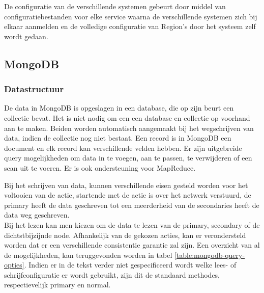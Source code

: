 De configuratie van de verschillende systemen gebeurt door middel van configuratiebestanden voor elke service waarna de verschillende systemen zich bij elkaar aanmelden en de volledige configuratie van Region's door het systeem zelf wordt gedaan.  

\subsection{MongoDB\cite{mongodb-manual}}

\subsubsection{Datastructuur}
De data in MongoDB is opgeslagen in een database, die op zijn beurt een collectie bevat. Het is niet nodig om een een database en collectie op voorhand aan te maken. Beiden worden automatisch aangemaakt bij het wegschrijven van data, indien de collectie nog niet bestaat. Een record is in MongoDB een document en elk record kan verschillende velden hebben. Er zijn uitgebreide query mogelijkheden om data in te voegen, aan te passen, te verwijderen of een scan uit te voeren. Er is ook ondersteuning voor MapReduce\cite{dean2008mapreduce}. 

Bij het schrijven van data, kunnen verschillende eisen gesteld worden voor het voltooien van de actie, startende met de actie is over het netwerk verstuurd, de primary heeft de data geschreven tot een meerderheid van de secondaries heeft de data weg geschreven. \\ Bij het lezen kan men kiezen om de data te lezen van de primary, secondary of de dichtstbijzijnde node. Afhankelijk van de gekozen acties, kan er verondersteld worden dat er een verschillende consistentie garantie zal zijn. Een overzicht van al de mogelijkheden, kan teruggevonden worden in tabel \ref{table:mongodb-query-opties}. Indien er in de tekst verder niet gespecificeerd wordt welke lees- of schrijfconfiguratie er wordt gebruikt, zijn dit de standaard methodes, respectievelijk primary en normal. 


